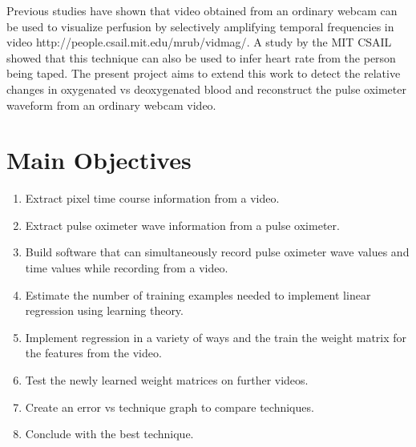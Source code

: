\documentclass[a0,landscape]{a0poster}
\begin{document}
\begin{multicols}{4}
Previous studies have shown that video obtained from an ordinary webcam can be used to visualize perfusion by selectively amplifying temporal frequencies in video {http://people.csail.mit.edu/mrub/vidmag/}. A study by the MIT CSAIL showed that this technique can also be used to infer heart rate from the person being taped. The present project aims to extend this work to detect the relative changes in oxygenated vs deoxygenated blood and reconstruct the pulse oximeter waveform from an ordinary webcam video.

\color{DarkSlateGray} %

\section*{Main Objectives}

\begin{enumerate}
\item Extract pixel time course information from a video.
\item Extract pulse oximeter wave information from a pulse oximeter.
\item Build software that can simultaneously record pulse oximeter wave values and time values while recording from a video.
\item Estimate the number of training examples needed to implement linear regression using learning theory.
\item Implement regression in a variety of ways and the train the weight matrix for the features from the video.
\item Test the newly learned weight matrices on further videos.
\item Create an error vs technique graph to compare techniques.
\item Conclude with the best technique.
\end{enumerate}

\vspace{8cm} %


\end{multicols}
\end{document}
